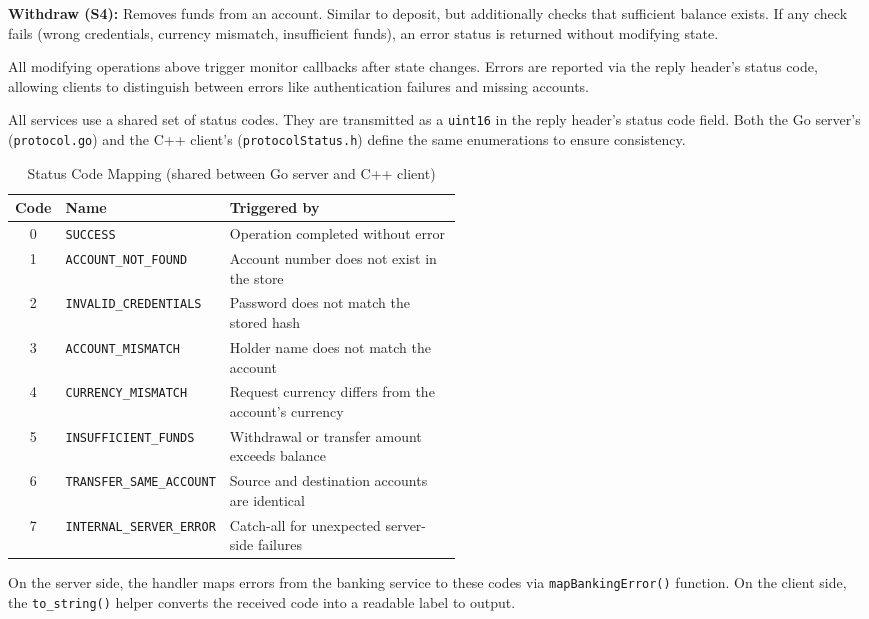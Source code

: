 \documentclass[9pt,a4paper]{article}
\begin{document}
\textbf{Withdraw (S4):} Removes funds from an account. Similar to deposit, but additionally checks that sufficient balance exists. If any check fails (wrong credentials, currency mismatch, insufficient funds), an error status is returned without modifying state.

All modifying operations above trigger monitor callbacks after state changes. Errors are reported via the reply header's status code, allowing clients to distinguish between errors like authentication failures and missing accounts.

All services use a shared set of status codes.
They are transmitted as a \texttt{uint16} in the reply header's status code field.
Both the Go server's (\texttt{protocol.go}) and the C++ client's (\texttt{protocolStatus.h}) define the same enumerations to ensure consistency.
 
\begin{table}[h]
\centering
\caption{Status Code Mapping (shared between Go server and C++ client)}
\label{tab:status-codes}
\begin{tabular}{c l p{0.52\linewidth}}
\toprule
\textbf{Code} & \textbf{Name} & \textbf{Triggered by} \\
\midrule
0 & \texttt{SUCCESS}               & Operation completed without error \\
1 & \texttt{ACCOUNT\_NOT\_FOUND}    & Account number does not exist in the store \\
2 & \texttt{INVALID\_CREDENTIALS}   & Password does not match the stored hash \\
3 & \texttt{ACCOUNT\_MISMATCH}      & Holder name does not match the account \\
4 & \texttt{CURRENCY\_MISMATCH}     & Request currency differs from the account's currency \\
5 & \texttt{INSUFFICIENT\_FUNDS}    & Withdrawal or transfer amount exceeds balance \\
6 & \texttt{TRANSFER\_SAME\_ACCOUNT}& Source and destination accounts are identical \\
7 & \texttt{INTERNAL\_SERVER\_ERROR} & Catch-all for unexpected server-side failures \\
\bottomrule
\end{tabular}
\end{table}
 
On the server side, the handler maps errors from the banking service to these codes via \texttt{mapBankingError()} function. 
On the client side, the \texttt{to\_string()} helper converts the received code into a readable label to output.
 
\end{document}
